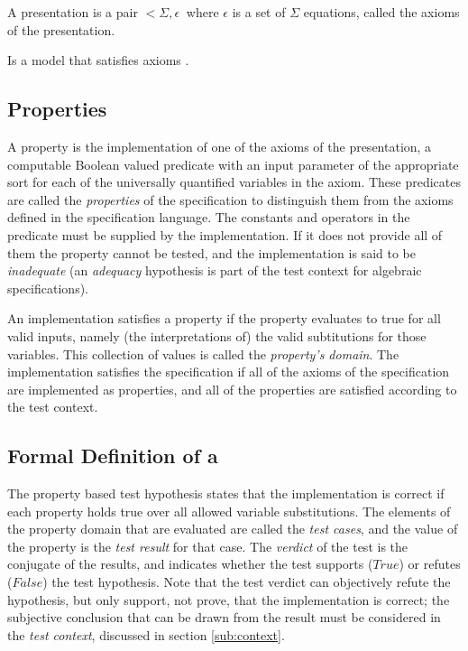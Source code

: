 \begin{df}[Presentation]
A presentation is a pair $<\Sigma, \epsilon\>$ where
$\epsilon$ is a set of $\Sigma$ equations, called the axioms of the presentation.
\end{df}

\begin{df}
Is a model that satisfies axioms .
\end{df}

\subsection{Properties} \label{formal_pbt}

A property is the implementation of one of the axioms of the presentation,
a computable Boolean valued predicate with an input parameter of the appropriate sort
for each of the universally quantified variables in the axiom.
These predicates are called the \emph{properties} of the specification
to distinguish them from the axioms defined in the specification language.
The constants and operators in the predicate must be supplied by the implementation.
If it does not provide all of them the property cannot be tested,
and  the implementation is said to be \emph{inadequate}
(an \emph{adequacy} hypothesis is part of the test context for algebraic specifications).

An implementation satisfies a property if
the property evaluates to true for all valid inputs,
namely (the interpretations of) the valid subtitutions for those variables.
This collection of values is called the \emph{property's domain}.
The implementation satisfies the specification if 
all of the axioms of the specification are implemented as properties,
and all of the properties are satisfied according to the test context.

\subsection{Formal Definition of a \pbt}

The property based test hypothesis states that the implementation is correct
if each property holds true over all allowed variable substitutions.
The elements of the property domain that are evaluated
are called the \emph{test cases},
and the value of the property is the \emph{test result} for that case.
The \emph{verdict} of the test is the conjugate of the results,
and indicates whether the test supports ($True$) or refutes ($False$) the test hypothesis.
Note that the test verdict can objectively refute the hypothesis,
but only support, not prove, that the implementation is correct;
the subjective conclusion that can be drawn from the result must be considered in the \emph{test context},
discussed in section \ref{sub:context}.

